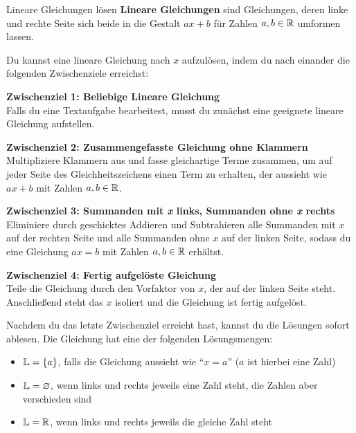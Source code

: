 \documentclass[../../main.tex]{subfiles}
\begin{document}
\begin{nutshell}{Lineare Gleichungen lösen}
    \textbf{Lineare Gleichungen} sind Gleichungen, deren linke und rechte Seite sich beide in die Gestalt $ax+b$ für Zahlen $a,b\in\mathbb{R}$ umformen lassen. 
    
    Du kannst eine lineare Gleichung nach $x$ aufzulösen, indem du nach einander die folgenden Zwischenziele erreichst:
    \vspace*{2mm}
    
    \textbf{Zwischenziel 1: Beliebige Lineare Gleichung}\\ 
    Falls du eine Textaufgabe bearbeitest, musst du zunächst eine geeignete lineare Gleichung aufstellen.
    \vspace*{2mm}
    
    \textbf{Zwischenziel 2: Zusammengefasste Gleichung ohne Klammern}\\
    Multipliziere Klammern aus und fasse gleichartige Terme zusammen, um auf jeder Seite des Gleichheitszeichens einen Term zu erhalten, der aussieht wie $ax+b$ mit Zahlen $a,b\in\mathbb{R}$.
    \vspace*{2mm}
    
    \textbf{Zwischenziel 3: Summanden mit \emph{x} links, Summanden ohne \emph{x} rechts}\\
    Eliminiere durch geschicktes Addieren und Subtrahieren alle Summanden mit $x$ auf der rechten Seite und alle Summanden ohne $x$ auf der linken Seite, sodass du eine Gleichung $ax=b$ mit Zahlen $a,b\in\mathbb{R}$ erhältst.
    \vspace*{2mm}
    
    \textbf{Zwischenziel 4: Fertig aufgelöste Gleichung}\\
    Teile die Gleichung durch den Vorfaktor von $x$, der auf der linken Seite steht. Anschließend steht das $x$ isoliert und die Gleichung ist fertig aufgelöst.
    \vspace*{4mm}
    
    Nachdem du das letzte Zwischenziel erreicht hast, kannst du die Lösungen sofort ablesen. Die Gleichung hat eine der folgenden Lösungsmengen:
    \begin{itemize}
        \item $\mathbb{L}=\{a\}$, falls die Gleichung aussieht wie \enquote{$x=a$} ($a$ ist hierbei eine Zahl)
        \item $\mathbb{L}=\varnothing$, wenn links und rechts jeweils eine Zahl steht, die Zahlen aber verschieden sind
        \item $\mathbb{L}=\mathbb{R}$, wenn links und rechts jeweils die gleiche Zahl steht
    \end{itemize}
\end{nutshell}
\end{document}
